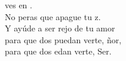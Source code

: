 \begin{cancion}%
	 ves en . \\
	No peras que apague tu z.\\
	Y ayúde a ser rejo de tu amor\\
	para que dos puedan verte, ñor,\\
	para que dos edan verte, Ser.\\
\end{cancion}%

